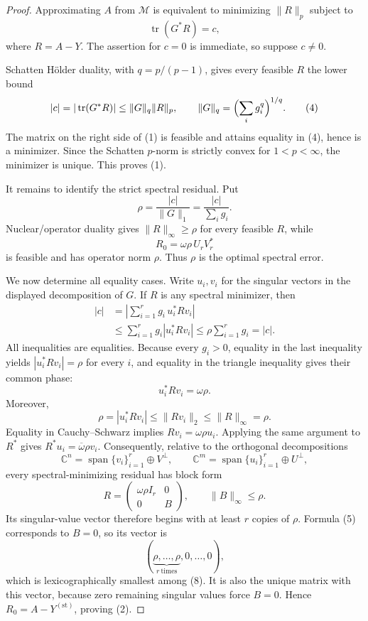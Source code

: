 \documentclass[11pt]{article}
\newcommand{\M}{\mathcal M}
\newcommand{\C}{\mathbb C}
\newcommand{\tr}{\operatorname{tr}}
\begin{document}
\begin{proof}
Approximating \(A\) from \(\M\) is equivalent to minimizing
\(\|R\|_p\) subject to
\[
                         \tr(G^*R)=c,                             \tag{3}
\]
where \(R=A-Y\).  The assertion for \(c=0\) is immediate, so suppose
\(c\ne0\).

Schatten H\"older duality, with \(q=p/(p-1)\), gives every feasible
\(R\) the lower bound
\[
 |c|=|\tr(G^*R)|\leq \|G\|_q\|R\|_p,\qquad
 \|G\|_q=\Bigl(\sum_i g_i^q\Bigr)^{1/q}.                          \tag{4}
\]
The matrix on the right side of (1) is feasible and attains equality
in (4), hence is a minimizer.  Since the Schatten \(p\)-norm is strictly
convex for \(1<p<\infty\), the minimizer is unique.  This proves (1).

It remains to identify the strict spectral residual.  Put
\[
                         \rho=\frac{|c|}{\|G\|_1}
                              =\frac{|c|}{\sum_i g_i}.
\]
Nuclear/operator duality gives \(\|R\|_\infty\geq\rho\) for every
feasible \(R\), while
\[
                         R_0=\omega\rho\,U_rV_r^*                 \tag{5}
\]
is feasible and has operator norm \(\rho\).  Thus \(\rho\) is the
optimal spectral error.

We now determine all equality cases.  Write \(u_i,v_i\) for the
singular vectors in the displayed decomposition of \(G\).  If \(R\) is
any spectral minimizer, then
\begin{equation}
\begin{split}
 |c|
 &=\left|\sum_{i=1}^r g_i\,u_i^*Rv_i\right|\\
 &\leq\sum_{i=1}^r g_i|u_i^*Rv_i|
 \leq\rho\sum_{i=1}^r g_i
 =|c|.
\end{split}
\tag{6}
\end{equation}
All inequalities are equalities.  Because every \(g_i>0\), equality in
the last inequality yields \(|u_i^*Rv_i|=\rho\) for every \(i\), and
equality in the triangle inequality gives their common phase:
\[
                         u_i^*Rv_i=\omega\rho.                    \tag{7}
\]
Moreover,
\[
 \rho=|u_i^*Rv_i|\leq\|Rv_i\|_2\leq\|R\|_\infty=\rho.
\]
Equality in Cauchy--Schwarz implies \(Rv_i=\omega\rho u_i\).
Applying the same argument to \(R^*\) gives
\(R^*u_i=\overline\omega\rho v_i\).  Consequently, relative to the
orthogonal decompositions
\[
 \C^n=\operatorname{span}\{v_i\}_{i=1}^r\oplus V^\perp,\qquad
 \C^m=\operatorname{span}\{u_i\}_{i=1}^r\oplus U^\perp,
\]
every spectral-minimizing residual has block form
\[
                         R=\begin{pmatrix}
                              \omega\rho I_r&0\\[2pt]0&B
                            \end{pmatrix},
                    \qquad \|B\|_\infty\leq\rho.                  \tag{8}
\]
Its singular-value vector therefore begins with at least \(r\) copies
of \(\rho\).  Formula (5) corresponds to \(B=0\), so its vector is
\[
                 (\underbrace{\rho,\ldots,\rho}_{r\ \mathrm{times}},
                  0,\ldots,0),
\]
which is lexicographically smallest among (8).  It is also the unique
matrix with this vector, because zero remaining singular values force
\(B=0\).  Hence \(R_0=A-Y^{(\mathrm{st})}\), proving (2).


\end{proof}
\end{document}
